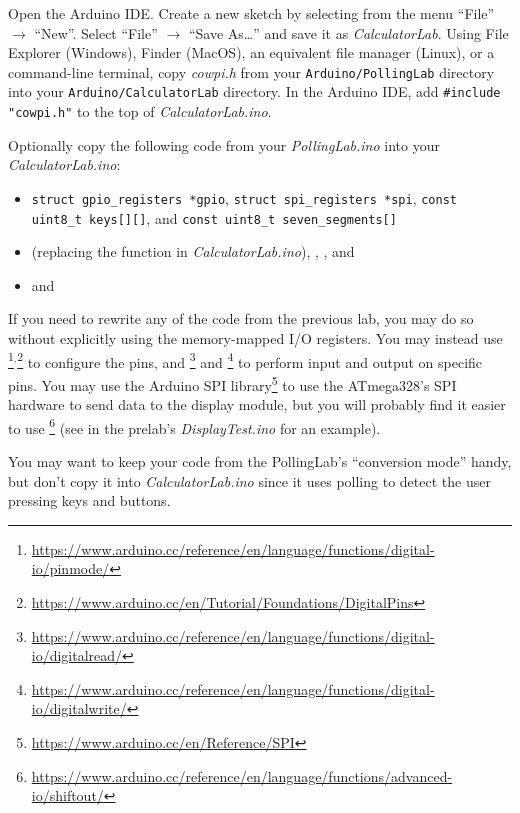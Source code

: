 Open the Arduino IDE. Create a new sketch by selecting from the menu ``File''
$\rightarrow$ ``New''. Select ``File'' $\rightarrow$ ``Save As\dots'' and save
it as \textit{CalculatorLab}. Using File Explorer (Windows), Finder (MacOS), an
equivalent file manager (Linux), or a command-line terminal, copy
\textit{cowpi.h} from your \texttt{Arduino/PollingLab} directory into your
\texttt{Arduino/CalculatorLab} directory. In the Arduino IDE, add
\lstinline{#include "cowpi.h"} to the top of \textit{CalculatorLab.ino}.

Optionally copy the following code from your \textit{PollingLab.ino} into your
\textit{CalculatorLab.ino}:
    \begin{itemize}
    \item \lstinline{struct gpio_registers *gpio},
        \lstinline{struct spi_registers *spi},
        \lstinline{const uint8_t keys[][]}, and
        \lstinline{const uint8_t seven_segments[]}
    \item {} (replacing the  function in
        \textit{CalculatorLab.ino}), ,
        , and 
    \item {} and 
    \end{itemize}

If you need to rewrite any of the code from the previous lab, you may do so
without explicitly using the memory-mapped I/O registers. You may instead use
\footnote{\url{https://www.arduino.cc/reference/en/language/functions/digital-io/pinmode/}}$^\mathrm{,}$\footnote{\url{https://www.arduino.cc/en/Tutorial/Foundations/DigitalPins}}
to configure the pins, and \footnote{\url{https://www.arduino.cc/reference/en/language/functions/digital-io/digitalread/}}
and \footnote{\url{https://www.arduino.cc/reference/en/language/functions/digital-io/digitalwrite/}}
to perform input and output on specific pins. You may use the Arduino SPI
library\footnote{\url{https://www.arduino.cc/en/Reference/SPI}} to use the
ATmega328's SPI hardware to send data to the display module, but you will
probably find it easier to use \footnote{\url{https://www.arduino.cc/reference/en/language/functions/advanced-io/shiftout/}}
(see  in the prelab's \textit{DisplayTest.ino} for an
example).

You may want to keep your code from the PollingLab's ``conversion mode'' handy,
but don't copy it into \textit{CalculatorLab.ino} since it uses polling to
detect the user pressing keys and buttons.

